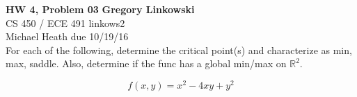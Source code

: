 \documentclass[12pt]{article}
\newenvironment{exercise}[2][Exercise]{\begin{trivlist}
\item[\hskip \labelsep {\bfseries #1}\hskip \labelsep {\bfseries #2.}]}{\end{trivlist}}
\begin{document}
\noindent
\large\textbf{HW 4, Problem 03} \hfill \textbf{Gregory Linkowski} \\
\normalsize CS 450 / ECE 491 \hfill linkows2 \\
Michael Heath \hfill due 10/19/16 \\


\vspace{5mm}
For each of the following, determine the critical point(s) and characterize as min, max, saddle. Also, determine if the func has a global min/max on $\mathbb{R}^2$. \\

\begin{exercise}{1}
	\[ f(x,y) = x^2 - 4xy + y^2 \]
\end{exercise}
\end{document}

